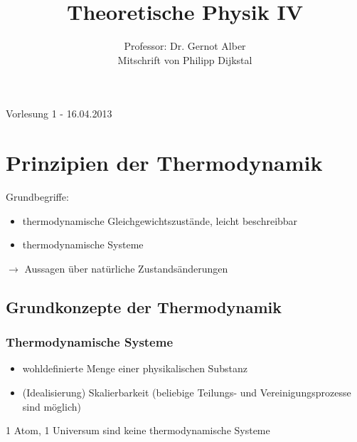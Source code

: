 \documentclass[10pt,article,colorback,accentcolor=tud9d]{tudreport}
\title{Theoretische Physik IV}
\subtitle{Professor: Dr. Gernot Alber\\
Mitschrift von Philipp Dijkstal}
\begin{document}
\maketitle
\tableofcontents
\newpage
Vorlesung 1 - 16.04.2013
\section{Prinzipien der Thermodynamik}
Grundbegriffe:
\begin{itemize}
\item thermodynamische Gleichgewichtszustände, leicht beschreibbar
\item thermodynamische Systeme
\end{itemize}
$\rightarrow$ Aussagen über natürliche Zustandsänderungen
\subsection{Grundkonzepte der Thermodynamik}
\subsubsection{Thermodynamische Systeme}
\begin{itemize}
\item wohldefinierte Menge einer physikalischen Substanz
\item (Idealisierung) Skalierbarkeit (beliebige Teilungs- und Vereinigungsprozesse sind möglich)
\end{itemize}
1 Atom, 1 Universum sind keine thermodynamische Systeme
\end{document}
